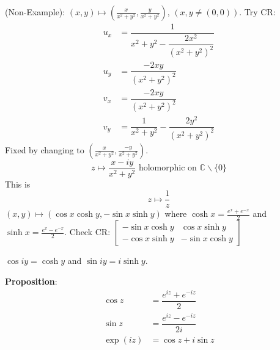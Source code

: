 \documentclass{report}
\begin{document}
\begin{examples}
    \begin{example}
        (Non-Example): $(x, y) \mapsto (\frac{x}{x^{2} + y^{2}}, \frac{y}{x^{2} + y^{2}})$, $(x, y \neq (0, 0))$. Try CR:
            \begin{align*}
                u_{x} &= \dfrac{1}{x^{2} + y^{2} - \dfrac{2x^{2}}{(x^{2} + y^{2})^{2}}} \\
                u_{y} &= \dfrac{-2xy}{(x^{2} + y^{2})^{2}} \\
                v_{x} &= \dfrac{-2xy}{(x^{2} + y^{2})^{2}} \\
                v_{y} &= \dfrac{1}{x^{2} + y^{2}} - \dfrac{2y^{2}}{(x^{2} + y^{2})^{2}}
            \end{align*}
        Fixed by changing to $(\frac{x}{x^{2} + y^{2}}, \frac{-y}{x^{2} + y^{2}})$. 
            \begin{equation*}
                z \mapsto \dfrac{x - iy}{x^{2} + y^{2}} \text{ holomorphic on $\mathbb{C} \backslash \{0\}$}
            \end{equation*}
        This is 
            \begin{equation*}
                z \mapsto \dfrac{1}{z}
            \end{equation*}
        $(x, y) \mapsto (\cos{x} \cosh{y}, -\sin{x \sinh{y}})$ where $\cosh{x} = \frac{e^{x}  + e^{-x}}{2}$ and $\sinh{x} = \frac{e^{x} - e^{-x}}{2}$. Check CR: $\begin{bmatrix}
            -\sin{x}\cosh{y} & \cos{x}\sinh{y}  \\
            -\cos{x}\sinh{y} & -\sin{x}\cosh{y}   
        \end{bmatrix}$
    \end{example}
\end{examples}

\begin{definition}{}
    $\cos{iy} = \cosh{y}$ and $\sin{iy} = i \sinh{y}$.
\end{definition}

\textbf{Proposition}:
    \begin{align*}
        \cos{z}  &= \dfrac{e^{iz} + e^{-iz}}{2}   \\
        \sin{z}  &= \dfrac{e^{iz} - e^{ -iz}}{2i} \\
        \exp(iz) &= \cos{z} + i\sin{z}              
    \end{align*}
\end{document}
